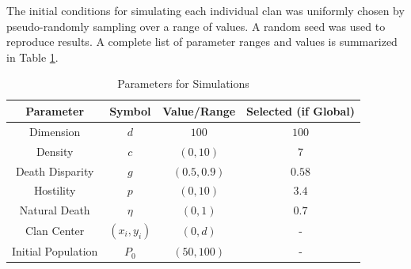 \documentclass[letterpaper, 9pt, conference]{ieeeconf}  %
\begin{document}
The initial conditions for simulating each individual clan was uniformly chosen by pseudo-randomly sampling over a range of values. A random seed was used to reproduce results. A complete list of parameter ranges and values is summarized in Table \ref{tab:parameters}.
\begin{table}[!h]
    \centering
    \begin{tabular}{|c|c|c|c|}\hline
        Parameter & Symbol & Value/Range & Selected (if Global)\\ \hline
        Dimension & $d$ & $100$ & $100$ \\ \hline
        Density & $c$ & $\left(0, 10\right)$ & $7$ \\ \hline
        Death Disparity & $g$ & $\left(0.5, 0.9\right)$ & $0.58$ \\ \hline
        Hostility & $p$ & $\left(0, 10\right)$ & $3.4$ \\ \hline
        Natural Death & $\eta$ & $\left(0, 1\right)$ & $0.7$ \\ \hline
        Clan Center & $\left(x_i, y_i\right)$ & $\left(0, d\right)$ & - \\ \hline
        Initial Population & $P_0$ & $\left(50, 100\right)$ & - \\ \hline
    \end{tabular}
    \caption{Parameters for Simulations}
    \label{tab:parameters}
\end{table}
\end{document}

